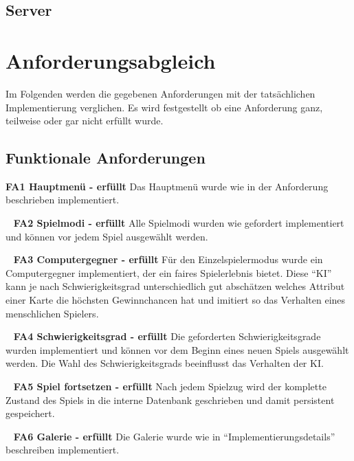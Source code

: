 \documentclass{scrartcl}
\begin{document}
\subsection{Server}

\section{Anforderungsabgleich}

Im Folgenden werden die gegebenen Anforderungen mit der tatsächlichen
Implementierung verglichen. Es wird festgestellt ob eine Anforderung ganz,
teilweise oder gar nicht erfüllt wurde.

\subsection{Funktionale Anforderungen}

\textbf{FA1 Hauptmenü - erfüllt} \newline
Das Hauptmenü wurde wie in der Anforderung beschrieben implementiert.

\ \newline
\textbf{FA2 Spielmodi - erfüllt} \newline
Alle Spielmodi wurden wie gefordert implementiert und können vor jedem Spiel
ausgewählt werden.

\ \newline
\textbf{FA3 Computergegner - erfüllt} \newline
Für den Einzelspielermodus wurde ein Computergegner implementiert, der ein
faires Spielerlebnis bietet. Diese \enquote{KI} kann je nach Schwierigkeitsgrad
unterschiedlich gut abschätzen welches Attribut einer Karte die höchsten
Gewinnchancen hat und imitiert so das Verhalten eines menschlichen Spielers.

\ \newline
\textbf{FA4 Schwierigkeitsgrad - erfüllt} \newline
Die geforderten Schwierigkeitsgrade wurden implementiert und können vor dem
Beginn eines neuen Spiels ausgewählt werden. Die Wahl des Schwierigkeitsgrads
beeinflusst das Verhalten der KI.

\ \newline
\textbf{FA5 Spiel fortsetzen - erfüllt} \newline
Nach jedem Spielzug wird der komplette Zustand des Spiels in die interne
Datenbank geschrieben und damit persistent gespeichert.

\ \newline
\textbf{FA6 Galerie - erfüllt} \newline
Die Galerie wurde wie in \enquote{Implementierungsdetails} beschreiben
implementiert.
\end{document}
